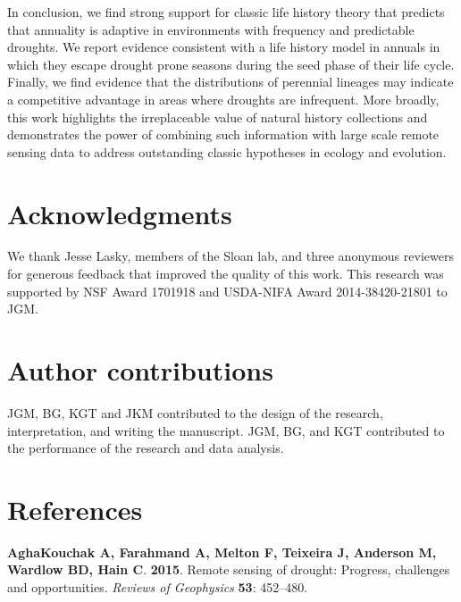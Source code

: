 \documentclass[man,floatsintext]{apa6}
\theoremstyle{definition}
\theoremstyle{definition}
\theoremstyle{definition}
\theoremstyle{remark}
\begin{document}
In conclusion, we find strong support for classic life history theory
that predicts that annuality is adaptive in environments with frequency
and predictable droughts. We report evidence consistent with a life
history model in annuals in which they escape drought prone seasons
during the seed phase of their life cycle. Finally, we find evidence
that the distributions of perennial lineages may indicate a competitive
advantage in areas where droughts are infrequent. More broadly, this
work highlights the irreplaceable value of natural history collections
and demonstrates the power of combining such information with large
scale remote sensing data to address outstanding classic hypotheses in
ecology and evolution.

\hypertarget{acknowledgments}{%
\section{Acknowledgments}\label{acknowledgments}}

We thank Jesse Lasky, members of the Sloan lab, and three anonymous
reviewers for generous feedback that improved the quality of this work.
This research was supported by NSF Award 1701918 and USDA-NIFA Award
2014-38420-21801 to JGM.

\hypertarget{author-contributions}{%
\section{Author contributions}\label{author-contributions}}

JGM, BG, KGT and JKM contributed to the design of the research,
interpretation, and writing the manuscript. JGM, BG, and KGT contributed
to the performance of the research and data analysis.

\hypertarget{references}{%
\section{References}\label{references}}

\begingroup
\setlength{\parindent}{-0.5in}
\setlength{\leftskip}{0.5in}

\hypertarget{refs}{}
\leavevmode\hypertarget{ref-aghakouchak2015remote}{}%
\textbf{\textnormal{AghaKouchak A}, \textnormal{Farahmand A},
\textnormal{Melton F}, \textnormal{Teixeira J}, \textnormal{Anderson M},
\textnormal{Wardlow BD}, \textnormal{Hain C}}. \textbf{2015}. Remote
sensing of drought: Progress, challenges and opportunities.
\emph{Reviews of Geophysics} \textbf{53}: 452--480.
\end{document}
